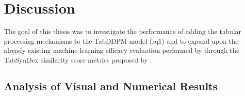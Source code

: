 \newpage
\section{Discussion}
\label{ch:results-discussion}
The goal of this thesis was to investigate the performance of adding the tabular processing mechanisms to the TabDDPM \gls{model} (\gls{rq}1) and
to expand upon the already existing machine learning efficacy evaluation performed by \cite{kotelnikov2022TabDDPMModellingTabular} through the TabSynDex similarity score metrics proposed by \cite{chundawat2022UniversalMetricRobust}.

\subsection*{Analysis of Visual and Numerical Results}

